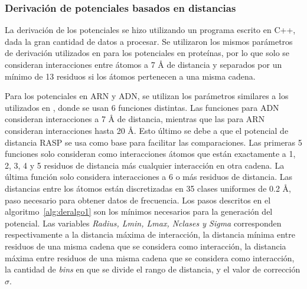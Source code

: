\subsubsection{Derivación de potenciales basados en distancias}
\par
La derivación de los potenciales se hizo utilizando un programa escrito en C++, dada la gran cantidad de datos a procesar.
Se utilizaron los mismos parámetros de derivación utilizados en \cite{Melo1998} para los potenciales en proteínas, por lo que solo se consideran interacciones entre átomos a 7 \si{\angstrom} de distancia y separados por un mínimo de 13 residuos si los átomos pertenecen a una misma cadena.

\par
Para los potenciales en ARN y ADN, se utilizan los parámetros similares a los utilizados en \cite{Capriotti2011}, donde se usan 6 funciones distintas. Las funciones para ADN consideran interacciones a 7 \si{\angstrom} de distancia, mientras que las para ARN consideran interacciones hasta 20 \si{\angstrom}.
Esto último se debe a que el potencial de distancia RASP se usa como base para facilitar las comparaciones.
Las primeras 5 funciones solo consideran como interacciones átomos que están exactamente a 1, 2, 3, 4 y 5 residuos de distancia más cualquier interacción en otra cadena. 
La última función solo considera interacciones a 6 o más residuos de distancia.
Las distancias entre los átomos están discretizadas en 35 clases uniformes de 0.2 \si{\angstrom}, paso necesario para obtener datos de frecuencia.
Los pasos descritos en el algoritmo~\ref{alg:deralgo1} son los mínimos necesarios para la generación del potencial. 
Las variables \textit{Radius, Lmin, Lmax, Nclases y Sigma} corresponden respectivamente a la distancia máxima de interacción, la distancia mínima entre residuos de una misma cadena que se considera como interacción, la distancia máxima entre residuos de una misma cadena que se considera como interacción, la cantidad de \textit{bins} en que se divide el rango de distancia, y el valor de corrección $\sigma$.

